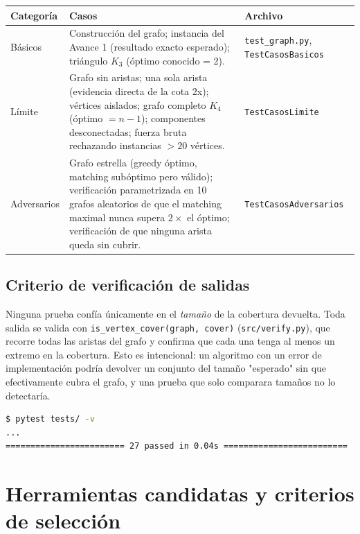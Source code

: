 \documentclass[11pt,a4paper]{article}
\begin{document}
\begin{center}
\small
\begin{tabular}{p{2.1cm}p{9.3cm}p{2.8cm}}
	\toprule
	\textbf{Categoría} & \textbf{Casos} & \textbf{Archivo} \\
	\midrule
	Básicos    & Construcción del grafo; instancia del Avance 1 (resultado exacto esperado);
	             triángulo $K_3$ (óptimo conocido = 2). & \texttt{test\_graph.py},
	             \texttt{TestCasos\-Basicos} \\[2pt]
	Límite     & Grafo sin aristas; una sola arista (evidencia directa de la cota 2x);
	             vértices aislados; grafo completo $K_4$ (óptimo $=n-1$); componentes
	             desconectadas; fuerza bruta rechazando instancias $>20$ vértices. &
	             \texttt{TestCasos\-Limite} \\[2pt]
	Adversarios & Grafo estrella (greedy óptimo, matching subóptimo pero válido);
	             verificación parametrizada en 10 grafos aleatorios de que el matching
	             maximal nunca supera $2\times$ el óptimo; verificación de que ninguna
	             arista queda sin cubrir. & \texttt{TestCasos\-Adversarios} \\
	\bottomrule
\end{tabular}
\end{center}
\normalsize

\subsection{Criterio de verificación de salidas}
Ninguna prueba confía únicamente en el \emph{tamaño} de la cobertura devuelta. Toda salida
se valida con \texttt{is\_vertex\_cover(graph, cover)} (\texttt{src/verify.py}), que
recorre todas las aristas del grafo y confirma que cada una tenga al menos un extremo en la
cobertura. Esto es intencional: un algoritmo con un error de implementación podría devolver
un conjunto del tamaño "esperado" sin que efectivamente cubra el grafo, y una prueba que
solo comparara tamaños no lo detectaría.

\begin{lstlisting}[language=bash]
$ pytest tests/ -v
...
======================== 27 passed in 0.04s =========================
\end{lstlisting}

\section{Herramientas candidatas y criterios de selección}
\end{document}
